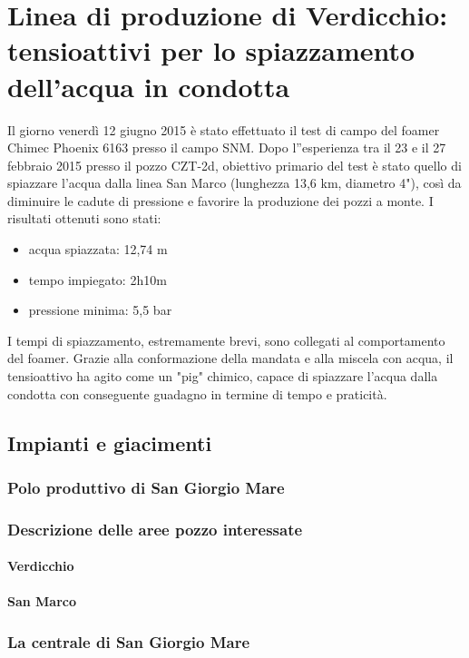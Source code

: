 \clearpage{\pagestyle{empty}\cleardoublepage}
\chapter{Linea di produzione di Verdicchio: tensioattivi per lo spiazzamento dell'acqua in condotta}
Il giorno venerdì 12 giugno 2015 è stato effettuato il test di campo del foamer Chimec  Phoenix 6163 presso il campo SNM. Dopo l''esperienza tra il 23 e il 27 febbraio 2015 presso il pozzo CZT-2d, obiettivo primario del test è stato quello di spiazzare l'acqua dalla linea San Marco (lunghezza 13,6 km, diametro 4"), così da diminuire le cadute di pressione e favorire la produzione dei pozzi a monte.
I risultati ottenuti sono stati:
\begin{itemize}
\item acqua spiazzata: 12,74 m
\item tempo impiegato: 2h10m
\item pressione minima: 5,5 bar
\end{itemize}
I tempi di spiazzamento, estremamente brevi, sono collegati al comportamento del foamer. Grazie alla conformazione della mandata e  alla miscela con acqua, il tensioattivo ha agito come un "pig" chimico, capace di spiazzare l'acqua dalla condotta con conseguente guadagno in termine di tempo e praticità.

\section{Impianti e giacimenti}
\subsection{Polo produttivo di San Giorgio Mare}
\subsection{Descrizione delle aree pozzo interessate}
\subsubsection{Verdicchio}
\subsubsection{San Marco}
\subsection{La centrale di San Giorgio Mare}
